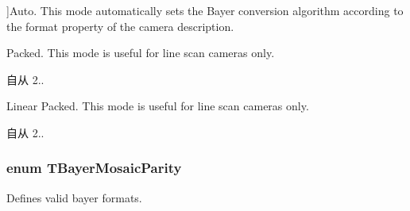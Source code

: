 \begin{Desc}
\begin{description}
{}]Auto. This mode automatically sets the Bayer conversion algorithm according to the format property of the camera description. \item[{\em 
\hypertarget{group___common_interface_ggab19b45fcaaa584be84a99a3d7098b055a40ef8442525e2816e98b5ad33eac4923}{bcm\+Packed}\label{group___common_interface_ggab19b45fcaaa584be84a99a3d7098b055a40ef8442525e2816e98b5ad33eac4923}
}]Packed. This mode is useful for line scan cameras only. \begin{DoxySince}{自从}
2.. 
\end{DoxySince}
\item[{\em 
\hypertarget{group___common_interface_ggab19b45fcaaa584be84a99a3d7098b055aeb581c81c7da5d972d56d6c164a19469}{bcm\+Linear\+Packed}\label{group___common_interface_ggab19b45fcaaa584be84a99a3d7098b055aeb581c81c7da5d972d56d6c164a19469}
}]Linear Packed. This mode is useful for line scan cameras only. \begin{DoxySince}{自从}
2.. 
\end{DoxySince}
\end{description}
\end{Desc}
\hypertarget{group___common_interface_ga9e2a1b46f3ed21b46b867c6d88d25598}{
\subsubsection[{T\+Bayer\+Mosaic\+Parity}]{\setlength{\rightskip}{0pt plus 5cm}enum {\bf T\+Bayer\+Mosaic\+Parity}}}\label{group___common_interface_ga9e2a1b46f3ed21b46b867c6d88d25598}


Defines valid bayer formats. 

